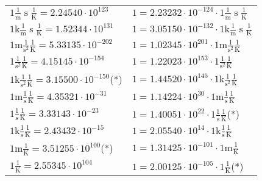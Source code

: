 \begin{center}
\begin{longtable}{l l}
{\color{black}$1 \bm{\mathrm{ }}\frac1{\operatorname{m}}{\operatorname{s}}{}\frac1{\operatorname{K}} = 2.24540\cdot10^{123} $}   & {\color{black}$ 1 = 2.23232\cdot10^{-124} \cdot 1 \bm{\mathrm{ }}\frac1{\operatorname{m}}{\operatorname{s}}{}\frac1{\operatorname{K}}$}  \\
{\color{gray}$1 \bm{\mathrm{ k}}\frac1{\operatorname{m}}{\operatorname{s}}{}\frac1{\operatorname{K}} = 1.52344\cdot10^{131} $}   & {\color{gray}$ 1 = 3.05150\cdot10^{-132} \cdot 1 \bm{\mathrm{ k}}\frac1{\operatorname{m}}{\operatorname{s}}{}\frac1{\operatorname{K}}$}  \\
{\color{gray}$1 \bm{\mathrm{ m}}{}\frac1{\operatorname{s}^2}{}\frac1{\operatorname{K}} = 5.33135\cdot10^{-202} $}   & {\color{gray}$ 1 = 1.02345\cdot10^{201} \cdot 1 \bm{\mathrm{ m}}{}\frac1{\operatorname{s}^2}{}\frac1{\operatorname{K}}$}  \\
{\color{black}$1 \bm{\mathrm{ }}{}\frac1{\operatorname{s}^2}{}\frac1{\operatorname{K}} = 4.15145\cdot10^{-154} $}   & {\color{black}$ 1 = 1.22023\cdot10^{153} \cdot 1 \bm{\mathrm{ }}{}\frac1{\operatorname{s}^2}{}\frac1{\operatorname{K}}$}  \\
{\color{gray}$1 \bm{\mathrm{ k}}{}\frac1{\operatorname{s}^2}{}\frac1{\operatorname{K}} = 3.15500\cdot10^{-150} $}\quad(*) & {\color{gray}$ 1 = 1.44520\cdot10^{145} \cdot 1 \bm{\mathrm{ k}}{}\frac1{\operatorname{s}^2}{}\frac1{\operatorname{K}}$}  \\
{\color{gray}$1 \bm{\mathrm{ m}}{}\frac1{\operatorname{s}}{}\frac1{\operatorname{K}} = 4.35321\cdot10^{-31} $}   & {\color{gray}$ 1 = 1.14224\cdot10^{30} \cdot 1 \bm{\mathrm{ m}}{}\frac1{\operatorname{s}}{}\frac1{\operatorname{K}}$}  \\
{\color{black}$1 \bm{\mathrm{ }}{}\frac1{\operatorname{s}}{}\frac1{\operatorname{K}} = 3.33143\cdot10^{-23} $}   & {\color{black}$ 1 = 1.40051\cdot10^{22} \cdot 1 \bm{\mathrm{ }}{}\frac1{\operatorname{s}}{}\frac1{\operatorname{K}}$}\quad(*)\\
{\color{gray}$1 \bm{\mathrm{ k}}{}\frac1{\operatorname{s}}{}\frac1{\operatorname{K}} = 2.43432\cdot10^{-15} $}   & {\color{gray}$ 1 = 2.05540\cdot10^{14} \cdot 1 \bm{\mathrm{ k}}{}\frac1{\operatorname{s}}{}\frac1{\operatorname{K}}$}  \\
{\color{gray}$1 \bm{\mathrm{ m}}{}{}{}\frac1{\operatorname{K}} = 3.51255\cdot10^{100} $}\quad(*) & {\color{gray}$ 1 = 1.31425\cdot10^{-101} \cdot 1 \bm{\mathrm{ m}}{}{}{}\frac1{\operatorname{K}}$}  \\
{\color{black}$1 \bm{\mathrm{ }}{}{}{}\frac1{\operatorname{K}} = 2.55345\cdot10^{104} $}   & {\color{black}$ 1 = 2.00125\cdot10^{-105} \cdot 1 \bm{\mathrm{ }}{}{}{}\frac1{\operatorname{K}}$}\quad(*)\\

\end{longtable}
\end{center}
